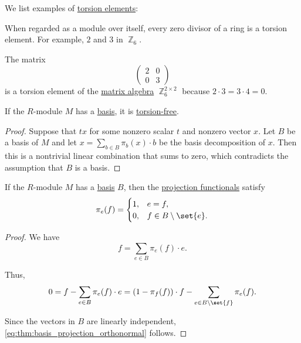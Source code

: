 \begin{example}\label{ex:def:semimodule_torsion}
  We list examples of \hyperref[def:semimodule_torsion]{torsion elements}:
  \begin{thmenum}
     When regarded as a module over itself, every zero divisor of a ring is a torsion element. For example, \( 2 \) and \( 3 \) in \( \BbbZ_6 \).

     The matrix
    \begin{equation*}
      \begin{pmatrix}
        2 & 0 \\
        0 & 3
      \end{pmatrix}
    \end{equation*}
    is a torsion element of the \hyperref[thm:matrix_algebra]{matrix algebra} \( \BbbZ_6^{2 \times 2} \) because \( 2 \cdot 3 = 3 \cdot 4 = 0 \).
  \end{thmenum}
\end{example}

\begin{proposition}\label{thm:basis_implies_torsion_free}
  If the \( R \)-module \( M \) has a \hyperref[def:hamel_basis]{basis}, it is \hyperref[def:semimodule_torsion]{torsion-free}.
\end{proposition}
\begin{proof}
  Suppose that \( tx \) for some nonzero scalar \( t \) and nonzero vector \( x \). Let \( B \) be a basis of \( M \) and let \( x = \sum_{b \in B} \pi_b(x) \cdot b \) be the basis decomposition of \( x \). Then this is a nontrivial linear combination that sums to zero, which contradicts the assumption that \( B \) is a basis.
\end{proof}

\begin{proposition}\label{thm:basis_projection_orthonormal}
  If the \( R \)-module \( M \) has a \hyperref[def:hamel_basis]{basis} \( B \), then the \hyperref[def:basis_decomposition]{projection functionals} satisfy
  \begin{equation}\label{eq:thm:basis_projection_orthonormal}
    \pi_e(f) = \begin{cases}
      1, &e = f, \\
      0, &f \in B \setminus \set{ e }.
    \end{cases}
  \end{equation}
\end{proposition}
\begin{proof}
  We have
  \begin{equation*}
    f = \sum_{e \in B} \pi_e(f) \cdot e.
  \end{equation*}

  Thus,
  \begin{equation*}
    0 = f - \sum_{e \in B} \pi_e(f) \cdot e = (1 - \pi_f(f)) \cdot f - \sum_{e \in B \setminus \set{ f }} \pi_e(f).
  \end{equation*}

  Since the vectors in \( B \) are linearly independent, \eqref{eq:thm:basis_projection_orthonormal} follows.
\end{proof}

